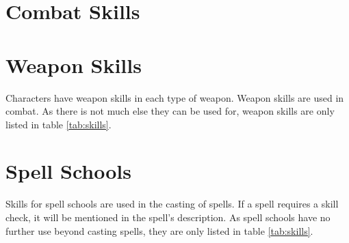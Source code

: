 \begin{multicols*}{2}
    \section{Combat Skills}

    \section{Weapon Skills}\label{weapon-skills}
    Characters have weapon skills in each type of weapon. Weapon skills are used in
    combat. As there is not much else they can be used for, weapon skills are only
    listed in table \ref{tab:skills}.


    \section{Spell Schools}\label{spell-schools}
    Skills for spell schools are used in the casting of spells. If a spell requires
    a skill check, it will be mentioned in the spell's description. As spell
    schools have no further use beyond casting spells, they are only listed in
    table \ref{tab:skills}.
\end{multicols*}

